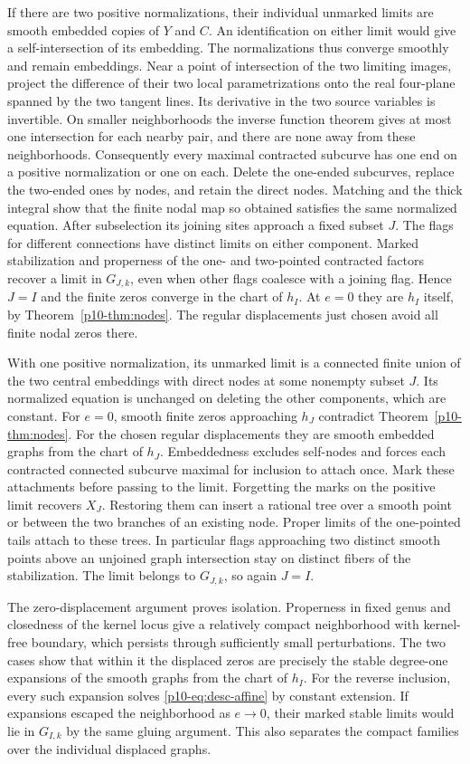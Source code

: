 If there are two positive normalizations, their individual unmarked
limits are smooth embedded copies of $Y$ and $C$. An identification
on either limit would give a self-intersection of its embedding.
The normalizations thus converge smoothly and remain embeddings.
Near a point of intersection of the two limiting images, project
the difference of their two local parametrizations onto the real
four-plane spanned by the two tangent lines. Its derivative in the
two source variables is invertible. On smaller neighborhoods the
inverse function theorem gives at most one intersection for
each nearby pair, and there are none away from these neighborhoods.
Consequently every maximal contracted subcurve has one end on
a positive normalization or one on each. Delete the one-ended
subcurves, replace the two-ended ones by nodes, and retain the
direct nodes. Matching and the thick integral show that the finite
nodal map so obtained satisfies the same normalized equation.
After subselection its joining sites approach a fixed subset $J$.
The flags for different connections have distinct limits on either
component. Marked stabilization and properness of the one- and
two-pointed contracted factors recover a limit in $G_{J,k}$, even
when other flags coalesce with a joining flag. Hence $J=I$ and the
finite zeros converge in the chart of $h_I$. At $e=0$ they are
$h_I$ itself, by Theorem~\ref{p10-thm:nodes}. The regular displacements
just chosen avoid all finite nodal zeros there.

With one positive normalization, its unmarked limit is a connected
finite union of the two central embeddings with direct nodes at some
nonempty subset $J$. Its normalized equation is unchanged on deleting
the other components, which are constant. For $e=0$, smooth finite
zeros approaching $h_J$ contradict Theorem~\ref{p10-thm:nodes}. For the
chosen regular displacements they are smooth embedded graphs from
the chart of $h_J$. Embeddedness excludes self-nodes and forces each
contracted connected subcurve maximal for inclusion to attach once.
Mark these attachments before passing to the limit. Forgetting the
marks on the positive limit recovers $X_J$. Restoring them can insert
a rational tree over a smooth point or between the two branches of an
existing node. Proper limits of the one-pointed tails attach to these
trees. In particular flags approaching two distinct smooth points
above an unjoined graph intersection stay on distinct fibers of the
stabilization. The limit belongs to $G_{J,k}$, so again $J=I$.

The zero-displacement argument proves isolation. Properness in fixed
genus and closedness of the kernel locus give a relatively compact
neighborhood with kernel-free boundary, which persists through
sufficiently small perturbations. The two cases show that within it
the displaced zeros are precisely the stable degree-one expansions
of the smooth graphs from the chart of $h_I$. For the reverse inclusion,
every such expansion solves \eqref{p10-eq:desc-affine} by constant
extension. If expansions escaped the neighborhood as $e\to0$, their
marked stable limits would lie in $G_{I,k}$ by the same gluing
argument. This also separates the compact families over the individual
displaced graphs.

